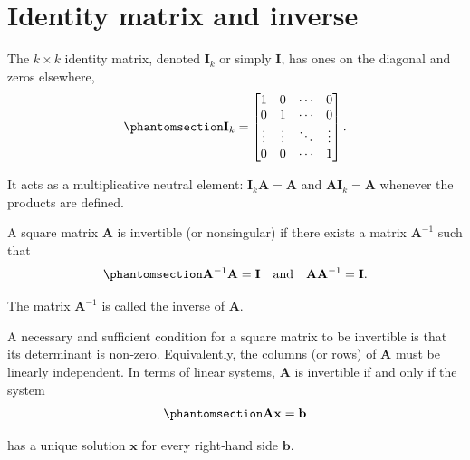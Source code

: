 \documentclass[
  letterpaper,
  DIV=11,
  numbers=noendperiod]{scrreprt}
\begin{document}
\section{Identity matrix and inverse}\label{identity-matrix-and-inverse}

The \(k \times k\) identity matrix, denoted \(\mathbf{I}_{k}\) or simply
\(\mathbf{I}\), has ones on the diagonal and zeros elsewhere,
\begin{equation}\protect\phantomsection\label{eq-gen-0051}{  
\begin{align}
\mathbf{I}_{k}
=
\begin{bmatrix}
1 & 0 & \cdots & 0 \\
0 & 1 & \cdots & 0 \\
\vdots & \vdots & \ddots & \vdots \\
0 & 0 & \cdots & 1
\end{bmatrix}.
\end{align}
}\end{equation}

It acts as a multiplicative neutral element:
\(\mathbf{I}_{k}\mathbf{A}=\mathbf{A}\) and
\(\mathbf{A}\mathbf{I}_{k}=\mathbf{A}\) whenever the products are
defined.

A square matrix \(\mathbf{A}\) is invertible (or nonsingular) if there
exists a matrix \(\mathbf{A}^{-1}\) such that
\begin{equation}\protect\phantomsection\label{eq-gen-0052}{  
\begin{align}
\mathbf{A}^{-1}\mathbf{A} = \mathbf{I}
\quad\text{and}\quad
\mathbf{A}\mathbf{A}^{-1} = \mathbf{I}.
\end{align}
}\end{equation}

The matrix \(\mathbf{A}^{-1}\) is called the inverse of \(\mathbf{A}\).

A necessary and sufficient condition for a square matrix to be
invertible is that its determinant is non‑zero. Equivalently, the
columns (or rows) of \(\mathbf{A}\) must be linearly independent. In
terms of linear systems, \(\mathbf{A}\) is invertible if and only if the
system \begin{equation}\protect\phantomsection\label{eq-gen-0053}{  
\begin{align}
\mathbf{A}\mathbf{x} = \mathbf{b}
\end{align}
}\end{equation}

has a unique solution \(\mathbf{x}\) for every right‑hand side
\(\mathbf{b}\).
\end{document}
